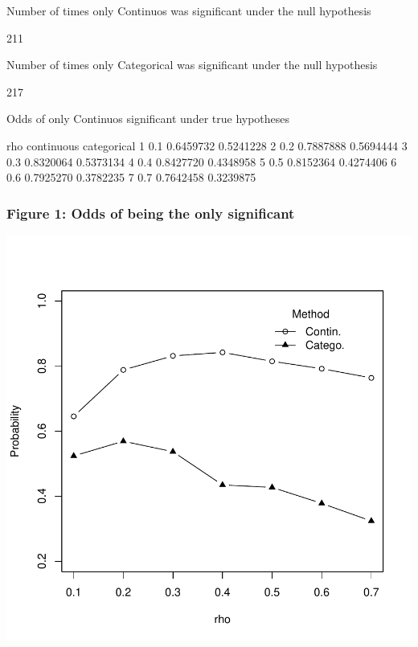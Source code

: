 \documentclass{article}
\begin{document}
\begin{Schunk}
\begin{Soutput}
Number of times only Continuos was significant under the null hypothesis
\end{Soutput}
\begin{Soutput}
[1] 211
\end{Soutput}
\begin{Soutput}
Number of times only Categorical was significant under the null hypothesis
\end{Soutput}
\begin{Soutput}
[1] 217
\end{Soutput}
\begin{Soutput}
Odds of only Continuos  significant under true hypotheses
\end{Soutput}
\begin{Soutput}
  rho continuous categorical
1 0.1  0.6459732   0.5241228
2 0.2  0.7887888   0.5694444
3 0.3  0.8320064   0.5373134
4 0.4  0.8427720   0.4348958
5 0.5  0.8152364   0.4274406
6 0.6  0.7925270   0.3782235
7 0.7  0.7642458   0.3239875
\end{Soutput}
\end{Schunk}


\subsubsection*{Figure 1: Odds of being the only significant}

\includegraphics{odds-two}
\end{document}
